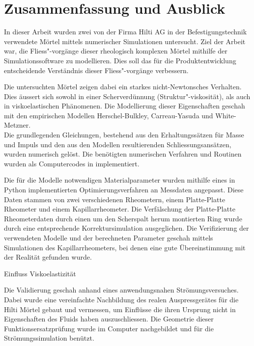 \section{Zusammenfassung und Ausblick}
\label{Kapitel:Outlook}
In dieser Arbeit wurden zwei von der Firma Hilti AG in der Befestigungstechnik verwendete Mörtel mittels numerischer Simulationen untersucht.
Ziel der Arbeit war, die Fliess"-vorgänge dieser rheologisch komplexen Mörtel mithilfe der Simulationssoftware \openfoam{} zu modellieren. Dies soll das für die Produktentwicklung entscheidende Verständnis dieser Fliess"-vorgänge verbessern.

Die untersuchten Mörtel zeigen dabei ein starkes nicht-Newtonsches Verhalten.
Dies äussert sich sowohl in einer Scherverdünnung (Struktur"-viskosität), als auch in viskoelastischen Phänomenen. Die Modellierung dieser Eigenschaften geschah mit den empirischen Modellen Herschel-Bulkley, Carreau-Yasuda und White-Metzner.\\
Die grundlegenden Gleichungen, bestehend aus den Erhaltungssätzen für Masse und Impuls und den aus den Modellen resultierenden Schliessungsansätzen, wurden numerisch gelöst. Die benötigten numerischen Verfahren und Routinen wurden als Computercodes in \openfoam{} implementiert.

Die für die Modelle notwendigen Materialparameter wurden mithilfe eines in Python implementierten Optimierungsverfahren an Messdaten angepasst. Diese Daten stammen von zwei verschiedenen Rheometern, einem Platte-Platte Rheometer und einem Kapillarrheometer.
Die Verfälschung der Platte-Platte Rheometerdaten durch einen um den Scherspalt herum montierten Ring wurde durch eine entsprechende Korrektursimulation ausgeglichen.
Die Verifizierung der verwendeten Modelle und der berechneten Parameter geschah mittels Simulationen des Kapillarrheometers, bei denen eine gute Übereinstimmung mit der Realität gefunden wurde.

\begin{todocontent}
    \1 Einfluss Viskoelastizität
\end{todocontent}

Die Validierung geschah anhand eines anwendungsnahen Strömungsversuches. Dabei wurde eine vereinfachte Nachbildung des realen Auspressgerätes für die Hilti Mörtel gebaut und vermessen, um Einflüsse die ihren Ursprung nicht in Eigenschaften des Fluids haben auszuschliessen.
Die Geometrie dieser Funktionsersatzprüfung wurde im Computer nachgebildet und für die Strömungssimulation benützt.

